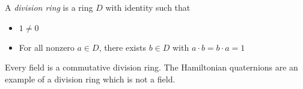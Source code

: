 \documentclass[12pt]{article}
\begin{document}
A \emph{division ring} is a ring $D$ with identity such that
\begin{itemize}
\item $1 \neq 0$
\item For all nonzero $a \in D$, there exists $b \in D$ with $a \cdot b = b \cdot a = 1$
\end{itemize}
Every field is a commutative division ring. The Hamiltonian quaternions are an example of a division ring which is not a field.

\end{document}
